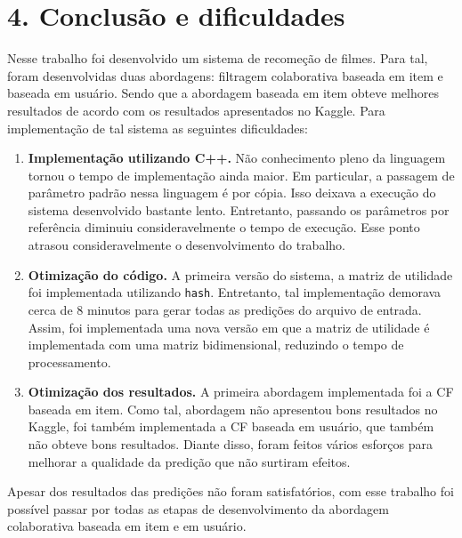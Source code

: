 \documentclass[brazil,a4paper,11pt]{article}
\begin{document}
\section{4. Conclusão e dificuldades}

Nesse trabalho foi desenvolvido um sistema de recomeção de filmes. Para tal, foram desenvolvidas duas abordagens: filtragem colaborativa baseada em item e baseada em usuário. Sendo que a abordagem baseada em item obteve melhores resultados de acordo com os resultados apresentados no Kaggle. Para implementação de tal sistema as seguintes dificuldades:

\begin{enumerate}
 \item \textbf{Implementação utilizando C++.} Não conhecimento pleno da linguagem tornou o tempo de implementação ainda maior. Em particular, a passagem de parâmetro padrão nessa linguagem é por cópia. Isso deixava a execução do sistema desenvolvido bastante lento. Entretanto, passando os parâmetros por referência diminuiu consideravelmente o tempo de execução. Esse ponto atrasou consideravelmente o desenvolvimento do trabalho.
 
 \item \textbf{Otimização do código.} A primeira versão do sistema, a matriz de utilidade foi implementada utilizando \texttt{hash}. Entretanto, tal implementação demorava cerca de 8 minutos para gerar todas as predições do arquivo de entrada. Assim, foi implementada uma nova versão em que a matriz de utilidade é implementada com uma matriz bidimensional, reduzindo o tempo de processamento.
 
 \item \textbf{Otimização dos resultados.} A primeira abordagem implementada foi a CF baseada em item. Como tal, abordagem não apresentou bons resultados no Kaggle, foi também implementada a CF baseada em usuário, que também não obteve bons resultados. Diante disso, foram feitos vários esforços para melhorar a qualidade da predição que não surtiram efeitos.
\end{enumerate}

Apesar dos resultados das predições não foram satisfatórios, com esse trabalho foi possível passar por todas as etapas de desenvolvimento da abordagem colaborativa baseada em item e em usuário. 


%

\end{document}
